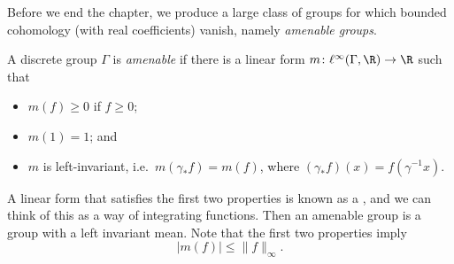 \documentclass[a4paper]{article}
\begin{document}
Before we end the chapter, we produce a large class of groups for which bounded cohomology (with real coefficients) vanish, namely \emph{amenable groups}.
\begin{defi}
  A discrete group $\Gamma$ is \emph{amenable} if there is a linear form $m\colon \ell^\infty(\Gamma,\R) \to \R$ such that
  \begin{itemize}
    \item $m(f) \geq 0$ if $f \geq 0$;
    \item $m(1) = 1$; and
    \item $m$ is left-invariant, i.e.\ $m(\gamma_* f) = m(f)$, where $(\gamma_* f)(x) = f(\gamma^{-1}x)$.
  \end{itemize}
\end{defi}
A linear form that satisfies the first two properties is known as a , and we can think of this as a way of integrating functions. Then an amenable group is a group with a left invariant mean. Note that the first two properties imply
\[
  |m(f)| \leq \|f\|_\infty.
\]
\end{document}
